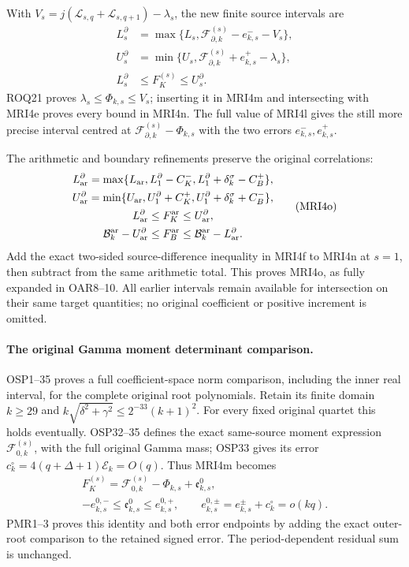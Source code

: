 \documentclass[11pt,a4paper]{article}
\begin{document}
With $V_s=j(\mathcal L_{s,q}+\mathcal L_{s,q+1})-\lambda_s$,
the new finite source intervals are
\[
 \begin{split}
 L_s^\partial&=\max\{L_s,
          \mathcal F_{\partial,k}^{(s)}-e_{k,s}^--V_s\},\\
 U_s^\partial&=\min\{U_s,
          \mathcal F_{\partial,k}^{(s)}+e_{k,s}^+-\lambda_s\},\\
 L_s^\partial&\le F_K^{(s)}\le U_s^\partial.
 \end{split}\tag{MRI4n}
\]
ROQ21 proves $\lambda_s\le\Phi_{k,s}\le V_s$; inserting it in
MRI4m and intersecting with MRI4e proves every bound in MRI4n.
The full value of MRI4l gives the still more precise interval
centred at $\mathcal F_{\partial,k}^{(s)}-\Phi_{k,s}$ with
the two errors $e_{k,s}^-,e_{k,s}^+$.

The arithmetic and boundary refinements preserve the original
correlations:
\[
 \begin{gathered}
 L_{\rm ar}^\partial=\max\{L_{\rm ar},L_1^\partial-C_K^-,
                     L_1^\partial+\delta_k^\sigma-C_B^+\},\\
 U_{\rm ar}^\partial=\min\{U_{\rm ar},U_1^\partial+C_K^+,
                     U_1^\partial+\delta_k^\sigma+C_B^-\},\\
 L_{\rm ar}^\partial\le F_K^{\rm ar}\le U_{\rm ar}^\partial,\\
 \mathcal B_k^{\rm ar}-U_{\rm ar}^\partial
       \le F_B^{\rm ar}\le\mathcal B_k^{\rm ar}-L_{\rm ar}^\partial.
 \end{gathered}\tag{MRI4o}
\]
Add the exact two-sided source-difference inequality in MRI4f
to MRI4n at $s=1$, then subtract from the same arithmetic total.
This proves MRI4o, as fully expanded in OAR8--10. All earlier
intervals remain available for intersection on their same target
quantities; no original coefficient or positive increment is omitted.


\paragraph{The original Gamma moment determinant comparison.}
OSP1--35 proves a full coefficient-space norm comparison, including
the inner real interval, for the complete original root polynomials.
Retain its finite domain $k\ge29$ and
$k\sqrt{\delta^2+\gamma^2}\le2^{-33}(k+1)^2$.
For every fixed original quartet this holds eventually. OSP32--35
defines the exact same-source moment expression
$\mathcal F_{0,k}^{(s)}$, with the full original Gamma mass;
OSP33 gives its error $c_k^\circ=4(q+\Delta+1)\mathcal E_k=O(q)$.
Thus MRI4m becomes
\[
 \begin{gathered}
 F_K^{(s)}=\mathcal F_{0,k}^{(s)}-\Phi_{k,s}+\mathfrak e^0_{k,s},\\
 -e_{k,s}^{0,-}\le\mathfrak e^0_{k,s}\le e_{k,s}^{0,+},\qquad
 e_{k,s}^{0,\pm}=e_{k,s}^\pm+c_k^\circ=o(kq).
 \end{gathered}\tag{MRI4p}
\]
PMR1--3 proves this identity and both error endpoints by adding
the exact outer-root comparison to the retained signed error.
The period-dependent residual sum is unchanged.
\end{document}
